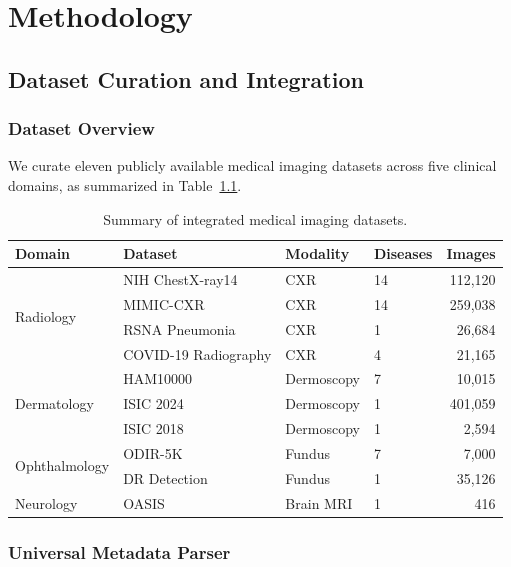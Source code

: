 \documentclass[12pt,a4paper]{report}
\begin{document}
\chapter{Methodology}

\section{Dataset Curation and Integration}

\subsection{Dataset Overview}

We curate eleven publicly available medical imaging datasets across five clinical domains, as summarized in Table~\ref{tab:datasets}.

\begin{table}[ht]
\centering
\caption{Summary of integrated medical imaging datasets.}
\label{tab:datasets}
\begin{tabular}{@{}llllr@{}}
\toprule
\textbf{Domain} & \textbf{Dataset} & \textbf{Modality} & \textbf{Diseases} & \textbf{Images} \\
\midrule
\multirow{4}{*}{Radiology} 
    & NIH ChestX-ray14 & CXR & 14 & 112,120 \\
    & MIMIC-CXR & CXR & 14 & 259,038 \\
    & RSNA Pneumonia & CXR & 1 & 26,684 \\
    & COVID-19 Radiography & CXR & 4 & 21,165 \\
\midrule
\multirow{3}{*}{Dermatology}
    & HAM10000 & Dermoscopy & 7 & 10,015 \\
    & ISIC 2024 & Dermoscopy & 1 & 401,059 \\
    & ISIC 2018 & Dermoscopy & 1 & 2,594 \\
\midrule
\multirow{2}{*}{Ophthalmology}
    & ODIR-5K & Fundus & 7 & 7,000 \\
    & DR Detection & Fundus & 1 & 35,126 \\
\midrule
Neurology & OASIS & Brain MRI & 1 & 416 \\
\bottomrule
\end{tabular}
\end{table}

\subsection{Universal Metadata Parser}
\end{document}
